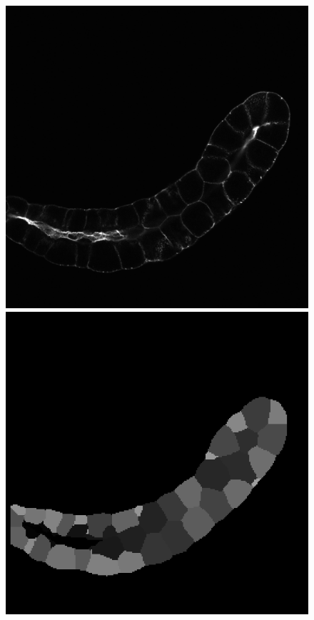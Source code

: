 \begin{figure}[ht]
\includegraphics[scale=0.2]{img/raw 04_1a Z=100.png}
\includegraphics[scale=0.2]{img/target 04_1a Z=77.png}

\end{figure}
